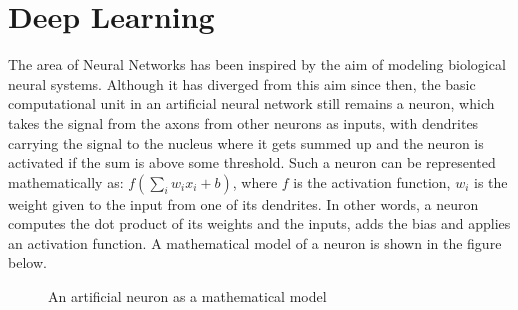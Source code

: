 \section*{Deep Learning}
\label{section:dl-background}
The area of Neural Networks has been inspired by the aim of modeling biological 
neural systems. Although it has diverged from this aim since then, the basic 
computational unit in an artificial neural network still remains a neuron, 
which takes the signal from the axons from other neurons as inputs, 
with dendrites carrying the signal to the nucleus where it gets summed up and 
the neuron is activated if the sum is above some threshold. Such a neuron can 
be represented mathematically as: $f(\sum_i w_ix_i + b)$, where $f$ is the 
activation function, $w_i$ is the weight given to the input from one of its 
dendrites. In other words, a neuron computes the dot product of its weights and 
the inputs, adds the bias and applies an activation function. A mathematical 
model of a neuron is shown in the figure below.
\begin{figure}[H]
\caption{An artificial neuron as a mathematical model}
\end{figure}

